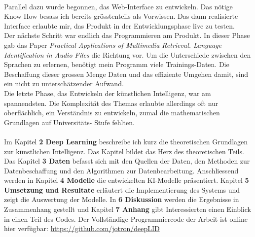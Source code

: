 \\
Parallel dazu wurde begonnen, das Web-Interface zu entwickeln. Das nötige Know-How besass ich bereits grösstenteils als Vorwissen. Das dann realisierte Interface erlaubte mir, das Produkt in der Entwicklungsphase live zu testen. 
\\
Der nächste Schritt war endlich das Programmieren am Produkt. In dieser Phase gab das Paper \textit{Practical Applications of Multimedia Retrieval. Language Identification in Audio
Files}\parencite{iLID} die Richtung vor. 
Um die Unterschiede zwischen den Sprachen zu erlernen, benötigt mein Programm viele Trainings-Daten. Die Beschaffung dieser grossen Menge Daten und das effiziente Umgehen damit, sind ein nicht zu unterschätzender Aufwand. 
\\
Die letzte Phase, das Entwickeln der künstlichen Intelligenz, war am spannendsten. Die Komplexität des Themas erlaubte allerdings oft nur oberflächlich, ein Verständnis zu entwickeln, zumal die mathematischen Grundlagen auf Universitäts- Stufe fehlten. 
\\ \\
Im Kapitel \textbf{2 Deep Learning} beschreibe ich kurz die theoretischen Grundlagen zur künstlichen Intelligenz. Das Kapitel bildet das Herz des theoretischen Teils. Das Kapitel \textbf{3
Daten} befasst sich mit den Quellen der Daten, den Methoden zur Datenbeschaffung und den Algorithmen zur Datenbearbeitung. Anschliessend werden in Kapitel \textbf{4 Modelle} die entwickelten KI-Modelle präsentiert. Kapitel \textbf{5 Umsetzung und Resultate} erläutert die Implementierung des Systems und zeigt die Auswertung der Modelle. In \textbf{6 Diskussion} werden die
Ergebnisse in Zusammenhang gestellt und Kapitel \textbf{7 Anhang} gibt Interessierten einen Einblick in einen Teil des Codes. Der Vollständige Programmiercode der Arbeit ist online hier verfügbar: \url{https://github.com/jotron/deepLID}
